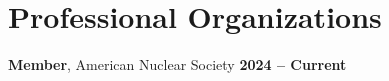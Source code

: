 \section{\mysidestyle Professional Organizations}
\textbf{Member}, American Nuclear Society \hfill \textbf{2024 -- Current} \\
